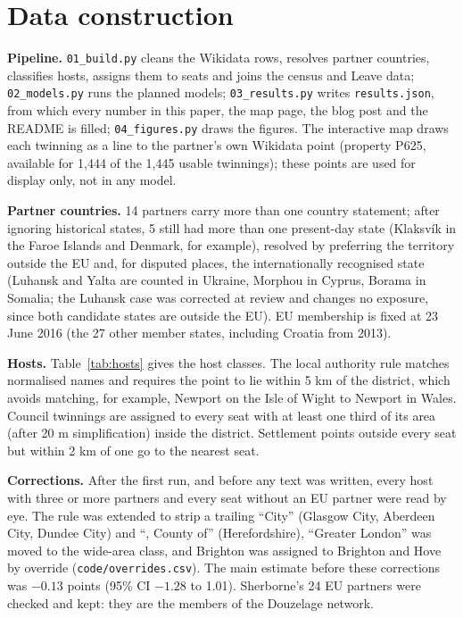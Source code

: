 \documentclass[11pt,a4paper]{article}
\begin{document}
\section{Data construction}\label{app:data}
\textbf{Pipeline.} \texttt{01\_build.py} cleans the Wikidata rows, resolves partner countries, classifies hosts, assigns them to seats and joins the census and Leave data; \texttt{02\_models.py} runs the planned models; \texttt{03\_results.py} writes \texttt{results.json}, from which every number in this paper, the map page, the blog post and the README is filled; \texttt{04\_figures.py} draws the figures. The interactive map draws each twinning as a line to the partner's own Wikidata point (property P625, available for 1,444 of the 1,445 usable twinnings); these points are used for display only, not in any model.

\textbf{Partner countries.} 14 partners carry more than one country statement; after ignoring historical states, 5 still had more than one present-day state (Klaksv\'ik in the Faroe Islands and Denmark, for example), resolved by preferring the territory outside the EU and, for disputed places, the internationally recognised state (Luhansk and Yalta are counted in Ukraine, Morphou in Cyprus, Borama in Somalia; the Luhansk case was corrected at review and changes no exposure, since both candidate states are outside the EU). EU membership is fixed at 23 June 2016 (the 27 other member states, including Croatia from 2013).

\textbf{Hosts.} Table~\ref{tab:hosts} gives the host classes. The local authority rule matches normalised names and requires the point to lie within 5 km of the district, which avoids matching, for example, Newport on the Isle of Wight to Newport in Wales. Council twinnings are assigned to every seat with at least one third of its area (after 20 m simplification) inside the district. Settlement points outside every seat but within 2 km of one go to the nearest seat.

\textbf{Corrections.} After the first run, and before any text was written, every host with three or more partners and every seat without an EU partner were read by eye. The rule was extended to strip a trailing ``City'' (Glasgow City, Aberdeen City, Dundee City) and ``, County of'' (Herefordshire), ``Greater London'' was moved to the wide-area class, and Brighton was assigned to Brighton and Hove by override (\texttt{code/overrides.csv}). The main estimate before these corrections was $-0.13$ points (95\% CI $-1.28$ to 1.01). Sherborne's 24 EU partners were checked and kept: they are the members of the Douzelage network.
\end{document}
